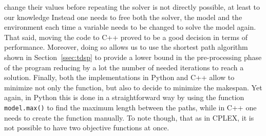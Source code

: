 change their values before repeating the solver is not directly possible, at
least to our knowledge Instead one needs to free both the solver, the model and
the environment each time a variable needs to be changed to solve the model
again. That said, moving the code to C++ proved to be a good decision in terms
of performance. \newline
Moreover, doing so allows us to use the shortest path algorithm shown in
Section~\ref{ssec:tdsp} to provide a lower bound in the pre-processing phase of
the program reducing by a lot the number of needed iterations to reach a
solution. \newline
Finally, both the implementations in Python and C++ allow to minimize not only
the  function, but also to decide to minimize the makespan. Yet 
again, in Python this is done in a straightforward way by using the function
\texttt{model.max()} to find the maximum length between the paths, while in C++
one needs to create the function manually. To note though, that as in CPLEX, it
is not possible to have two objective functions at once.
